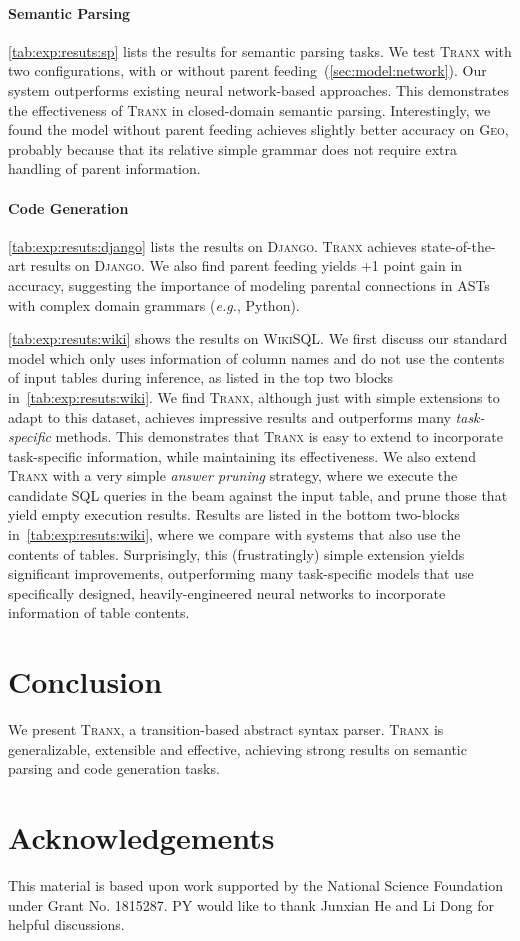\documentclass[11pt,a4paper]{article}
\newcommand{\eg}{{\emph{e.g.}},\xspace}
\def\model/{\textsc{Tranx}}
\def\django/{\textsc{Django}}
\def\wikisql/{\textsc{WikiSQL}}
\def\geo/{\textsc{Geo}}
\begin{document}
\paragraph{Semantic Parsing} \autoref{tab:exp:resuts:sp} lists the results for semantic parsing tasks.
We test \model/ with two configurations, with or without parent feeding~(\autoref{sec:model:network}). Our system outperforms existing neural network-based approaches.
This demonstrates the effectiveness of \model/ in closed-domain semantic parsing.
Interestingly, we found the model without parent feeding achieves slightly better accuracy on \geo/, probably because that its relative simple grammar does not require extra handling of parent information.

\paragraph{Code Generation}
\autoref{tab:exp:resuts:django} lists the results on \django/.
\model/ achieves state-of-the-art results on \django/.
We also find parent feeding yields +1 point gain in accuracy, suggesting the importance of modeling parental connections in ASTs with complex domain grammars (\eg Python).

\autoref{tab:exp:resuts:wiki} shows the results on \wikisql/. We first discuss our standard model which only uses information of column names and do not use the contents of input tables during inference, as listed in the top two blocks in~\autoref{tab:exp:resuts:wiki}.
We find \model/, although just with simple extensions to adapt to this dataset,
achieves impressive results and outperforms many \emph{task-specific} methods.
This demonstrates that \model/ is easy to extend to incorporate task-specific information, while maintaining its effectiveness.
We also extend \model/ with a very simple \emph{answer pruning} strategy, where we execute the candidate SQL queries in the beam against the input table, and prune those that yield empty execution results. 
Results are listed in the bottom two-blocks in~\autoref{tab:exp:resuts:wiki}, where we compare with systems that also use the contents of tables.
Surprisingly, this (frustratingly) simple extension yields significant improvements, outperforming many task-specific models that use specifically designed,
heavily-engineered 
neural networks to incorporate information of table contents.
\vspace{-1.5mm}
\section{Conclusion}
\vspace{-1.5mm}
We present \model/, a transition-based abstract syntax parser. 
\model/ is generalizable, extensible and effective, achieving strong results on semantic parsing and code generation tasks.

\vspace{-1mm}
\section*{Acknowledgements}
\vspace{-1mm}



This material is based upon work supported by the National Science Foundation under Grant No. 1815287. PY would like to thank Junxian He and Li Dong for helpful discussions.





\end{document}
